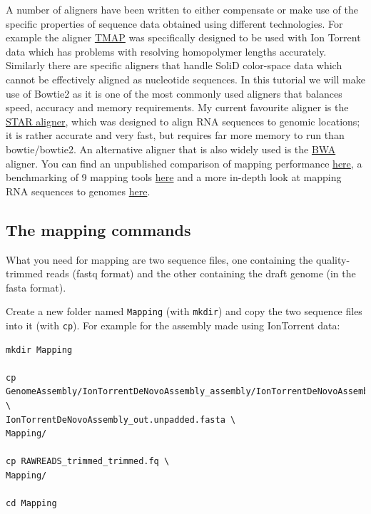 \documentclass[11pt]{article}
\begin{document}
A number of aligners have been written to either compensate or make use of
the specific properties of sequence data obtained using different
technologies. For example the aligner \href{https://www.google.no/url?sa=t&rct=j&q=&esrc=s&source=web&cd=5&ved=0CD4QFjAE&url=https\%3A\%2F\%2Fgithub.com\%2Fiontorrent\%2FTMAP&ei=1u07VZCXFYGqywPBz4DoDg&usg=AFQjCNE3vZXuQ1ygljhBcrozKj_nBU84TQ&sig2=u5_YVYBE904ay-9oLUuMOQ&bvm=bv.91665533,d.bGQ}{TMAP} was specifically
designed to be used with Ion Torrent data which has problems with resolving
homopolymer lengths accurately. Similarly there are specific aligners that
handle SoliD color-space data which cannot be effectively aligned as
nucleotide sequences. In this tutorial we will make use of Bowtie2 as it is
one of the most commonly used aligners that balances speed, accuracy and
memory requirements. My current favourite aligner is the \href{http://bioinformatics.oxfordjournals.org/content/early/2012/10/25/bioinformatics.bts635}{STAR aligner}, which
was designed to align RNA sequences to genomic locations; it is rather
accurate and very fast, but requires far more memory to run than bowtie/bowtie2.
An alternative aligner that is also widely used is the \href{http://bio-bwa.sourceforge.net/}{BWA} aligner. You can
find an unpublished comparison of mapping performance \href{http://genomespot.blogspot.no/2014/11/dna-aligner-accuracy-bwa-bowtie-soap.html}{here}, a benchmarking of
9 mapping tools \href{http://bmcbioinformatics.biomedcentral.com/articles/10.1186/1471-2105-14-184}{here} and a more in-depth look at mapping RNA sequences to genomes \href{http://www.nature.com/nmeth/journal/v10/n12/full/nmeth.2722.html}{here}.

\subsection{The mapping commands}
\label{sec:orgheadline1}

What you need for mapping are two sequence files, one containing the
quality-trimmed reads (fastq format) and the other containing the draft genome
(in the fasta format).

Create a new folder named \texttt{Mapping} (with \texttt{mkdir}) and copy the two
sequence files into it (with \texttt{cp}). For example for the assembly made using
IonTorrent data:


\begin{verbatim}
mkdir Mapping

cp GenomeAssembly/IonTorrentDeNovoAssembly_assembly/IonTorrentDeNovoAssembly_d_results/ \
IonTorrentDeNovoAssembly_out.unpadded.fasta \
Mapping/

cp RAWREADS_trimmed_trimmed.fq \
Mapping/

cd Mapping
\end{verbatim}
\end{document}
